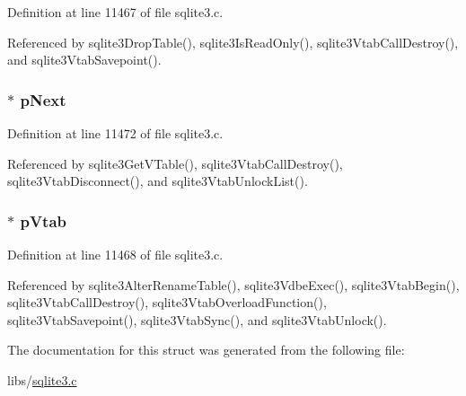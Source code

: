 Definition at line 11467 of file sqlite3.\+c.



Referenced by sqlite3\+Drop\+Table(), sqlite3\+Is\+Read\+Only(), sqlite3\+Vtab\+Call\+Destroy(), and sqlite3\+Vtab\+Savepoint().

\hypertarget{struct_v_table_a6d0df91e0570a86dd8b2ab2c4ebe9c30}{}
\subsubsection[{p\+Next}]{$\ast$ p\+Next}\label{struct_v_table_a6d0df91e0570a86dd8b2ab2c4ebe9c30}


Definition at line 11472 of file sqlite3.\+c.



Referenced by sqlite3\+Get\+V\+Table(), sqlite3\+Vtab\+Call\+Destroy(), sqlite3\+Vtab\+Disconnect(), and sqlite3\+Vtab\+Unlock\+List().

\hypertarget{struct_v_table_abfe9b838cea369f3646c0bdff58a069e}{}
\subsubsection[{p\+Vtab}]{$\ast$ p\+Vtab}\label{struct_v_table_abfe9b838cea369f3646c0bdff58a069e}


Definition at line 11468 of file sqlite3.\+c.



Referenced by sqlite3\+Alter\+Rename\+Table(), sqlite3\+Vdbe\+Exec(), sqlite3\+Vtab\+Begin(), sqlite3\+Vtab\+Call\+Destroy(), sqlite3\+Vtab\+Overload\+Function(), sqlite3\+Vtab\+Savepoint(), sqlite3\+Vtab\+Sync(), and sqlite3\+Vtab\+Unlock().



The documentation for this struct was generated from the following file\+:\begin{DoxyCompactItemize}
\item 
libs/\hyperlink{sqlite3_8c}{sqlite3.\+c}\end{DoxyCompactItemize}
